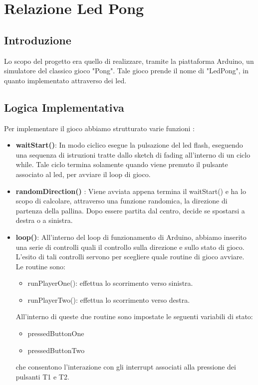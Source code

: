 \documentclass[a4paper]{article}
\begin{document}
\section*{Relazione Led Pong} 
\subsection*{Introduzione}
Lo scopo del progetto era quello di realizzare, tramite la piattaforma Arduino, un simulatore del classico gioco "Pong". Tale gioco prende il nome di "LedPong", in quanto implementato attraverso dei led.
\subsection*{Logica Implementativa}
Per implementare il gioco abbiamo strutturato varie funzioni :
\begin{itemize}
\item \textbf{waitStart()}: In modo ciclico esegue la pulsazione del led flash, eseguendo una sequenza di istruzioni tratte dallo sketch di fading all'interno di un ciclo while. Tale ciclo termina solamente quando viene premuto il pulsante associato al led, per avviare il loop di gioco.
\item \textbf{randomDirection()} : Viene avviata appena termina il waitStart() e ha lo scopo di calcolare, attraverso una funzione randomica, la direzione di partenza della pallina. Dopo essere partita dal centro, decide se spostarsi a destra o a sinistra.
 \item \textbf{loop()}: All'interno del loop di funzionamento di Arduino, abbiamo inserito una serie di controlli quali il controllo sulla direzione e sullo stato di gioco. L'esito di tali controlli servono per scegliere quale routine di gioco avviare. \\Le routine sono: 
\begin{itemize}
\item runPlayerOne(): effettua lo scorrimento verso sinistra.
\item runPlayerTwo(): effettua lo scorrimento verso destra.
\end{itemize}
All'interno di queste due routine sono impostate le seguenti variabili di stato:
\begin{itemize}
\item pressedButtonOne
\item pressedButtonTwo
\end{itemize}
che consentono l'interazione con gli interrupt associati alla pressione dei pulsanti T1 e T2.
\end{itemize}
\end{document}
